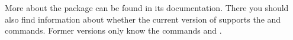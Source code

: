 More about the  package can be found in its
documentation. There you should also find information about whether the
current version of  supports the  and
 commands.  Former versions only know the commands
 and .%
%
%
%
%
%
%
%
%
%



